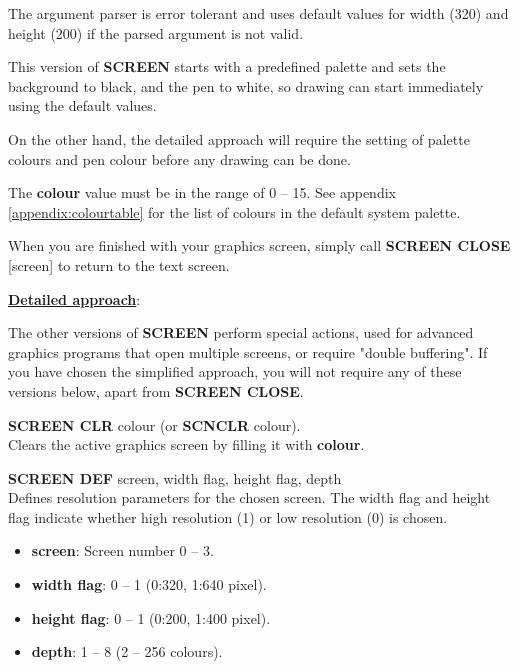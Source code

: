 \begin{description}[leftmargin=2cm,style=nextline]
                  The argument parser is error tolerant and uses default values for width (320) and height (200) if the parsed argument is not valid.

                  This version of {\bf SCREEN} starts with a predefined palette and sets the background to black, and the pen to white, so drawing can start immediately using the default values.

                  On the other hand, the detailed approach will require the setting of palette colours and pen colour before any drawing can be done.

                  The {\bf colour} value must be in the range of 0 -- 15. See appendix \vref{appendix:colourtable} for the list of colours in the default system palette.

                  When you are finished with your graphics screen, simply call {\bf SCREEN CLOSE} [screen] to return to the text screen.
                  
                  \underline{{\bf Detailed approach}}:

                  The other versions of {\bf SCREEN} perform special actions, used for advanced graphics programs that open multiple screens, or require "double buffering". If you have chosen the simplified approach, you will not require any of these versions below, apart from {\bf SCREEN CLOSE}.

                  {\bf SCREEN CLR} colour (or {\bf SCNCLR} colour). \\
                  Clears the active graphics screen by filling it with {\bf colour}.

                  {\bf SCREEN DEF} screen, width flag, height flag, depth \\
                  Defines resolution parameters for the chosen screen. The width flag and height flag indicate whether high resolution (1) or low resolution (0) is chosen.

                  \begin{itemize}
                     \item {\bf screen}: Screen number 0 -- 3.
                     \item {\bf width flag}: 0 -- 1 (0:320, 1:640 pixel).
                     \item {\bf height flag}: 0 -- 1 (0:200, 1:400 pixel).
                     \item {\bf depth}: 1 -- 8 (2 -- 256 colours).
                  \end{itemize}


\end{description}
